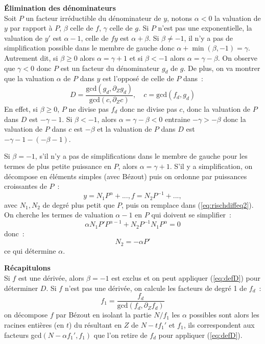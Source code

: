 \documentclass[a4paper,11pt]{article}
\begin{document}
{\bf \'Elimination des d\'enominateurs}\\
Soit $P$ un facteur irréductible du d\'enominateur de $y$, notons 
$\alpha<0$ la valuation de $y$ par rapport \`a $P$, 
$\beta$ celle de $f$, $\gamma$ celle de $g$. 
Si $P$ n'est pas une exponentielle,
la valuation de $y'$ est $\alpha-1$, celle de $ f y $ est $\alpha +\beta $. 
Si $\beta \neq -1$, 
il n'y a pas de simplification possible dans le membre de gauche
donc $\alpha + \min(\beta,-1) =\gamma$. Autrement dit, si 
$\beta \geq 0$ alors $\alpha=\gamma+1$ et si $\beta<-1$ 
alors $\alpha=\gamma-\beta$.
On observe que $\gamma<0$ donc
$P$ est un facteur du d\'enominateur $g_d$ de $g$. De plus, on va montrer
que la valuation $\alpha$ de $P$ dans $y$ est l'oppos\'e de celle
de $P$ dans~:
\begin{equation} \label{eq:defD}
D=\frac{\mbox{gcd}(g_d,\partial_Z g_d)}{\mbox{gcd}(c,\partial_Z c)}, 
\quad c=\mbox{gcd}(f_d,g_d)
\end{equation}
En effet, si $\beta \geq 0$, $P$ ne divise pas $f_d$ donc ne divise
pas $c$, donc la valuation de $P$ dans $D$ est $-\gamma-1$. Si $\beta < -1$,
alors $\alpha=\gamma - \beta <0$ entraine $-\gamma > -\beta$ donc la
valuation de $P$ dans $c$ est $-\beta$ et la valuation de $P$ dans $D$
est $-\gamma-1 - (-\beta-1)$.

Si $\beta=-1$, s'il n'y a pas de simplifications dans le membre
de gauche pour les termes de plus petite puissance en $P$, alors 
$\alpha=\gamma+1$. S'il y a simplification,
on d\'ecompose en \'el\'ements
simples (avec B\'ezout) puis on ordonne par puissances croissantes
de $P$~:
\[y= N_1 P^\alpha +..., f= N_2 P^{-1}+...,\]
avec $N_1,N_2$ de degré plus petit que $P$, puis on remplace dans 
(\ref{eq:rischdiffeq2}). On cherche les termes de valuation $\alpha-1$
en $P$ qui doivent se simplifier~:
\[ \alpha N_1 P' P^{\alpha-1} + N_2 P^{-1} N_1 P^\alpha =0 \]
donc~:
\[ N_2 = -\alpha P' \]
ce qui d\'etermine $\alpha$.

{\bf Récapitulons}\\
Si $f$ est une dérivée, alors $\beta=-1$ est exclus et on peut
appliquer (\ref{eq:defD}) pour déterminer $D$. Si $f$ n'est
pas une dérivée, on calcule les facteurs de degré 1 de $f_d$~:
\[ f_1=\frac{f_d}{\mbox{gcd}(f_d,\partial_Z f_d)} \]
on décompose $f$ par Bézout en isolant la partie $N/f_1$
les $\alpha$ possibles sont alors les racines entières (en $t$)
du résultant en $Z$ de $N-tf_1'$ et $f_1$, ils correspondent aux
facteurs gcd$(N-\alpha f_1',f_1)$ que l'on retire de $f_d$ pour
appliquer (\ref{eq:defD}).
\end{document}
